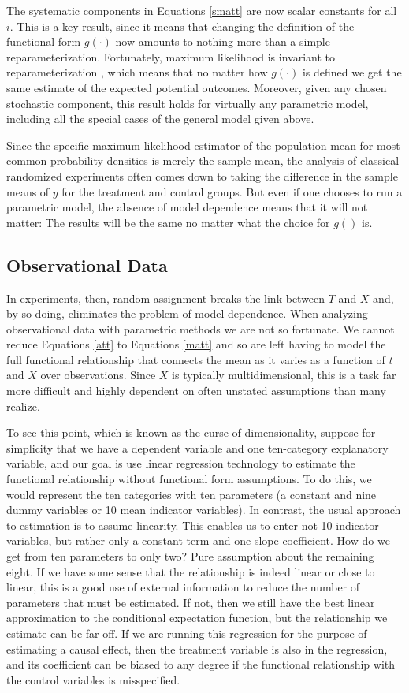 \documentclass[11pt,titlepage]{article}
\begin{document}
The systematic components in Equations \ref{smatt} are now scalar
constants for all $i$.  This is a key result, since it means that
changing the definition of the functional form $g(\cdot)$ now amounts
to nothing more than a simple reparameterization.  Fortunately,
maximum likelihood is invariant to reparameterization
\citep[][p.75-6]{King89}, which means that no matter how $g(\cdot)$ is
defined we get the same estimate of the expected potential outcomes.
Moreover, given any chosen stochastic component, this result holds for
virtually any parametric model, including all the special cases of the
general model given above.

Since the specific maximum likelihood estimator of the population mean
for most common probability densities is merely the sample mean, the
analysis of classical randomized experiments often comes down to
taking the difference in the sample means of $y$ for the treatment and
control groups.  But even if one chooses to run a parametric model,
the absence of model dependence means that it will not matter: The
results will be the same no matter what the choice for $g()$ is.

\subsection{Observational Data} \label{s:paraobs}

In experiments, then, random assignment breaks the link between $T$
and $X$ and, by so doing, eliminates the problem of model dependence.
When analyzing observational data with parametric methods we are not
so fortunate.  We cannot reduce Equations \ref{att} to Equations
\ref{matt} and so are left having to model the full functional
relationship that connects the mean as it varies as a function of $t$
and $X$ over observations.  Since $X$ is typically multidimensional,
this is a task far more difficult and highly dependent on often
unstated assumptions than many realize.

To see this point, which is known as the curse of dimensionality,
suppose for simplicity that we have a dependent variable and one
ten-category explanatory variable, and our goal is use linear
regression technology to estimate the functional relationship without
functional form assumptions.  To do this, we would represent the ten
categories with ten parameters (a constant and nine dummy variables or
10 mean indicator variables).  In contrast, the usual approach to
estimation is to assume linearity.  This enables us to enter not 10
indicator variables, but rather only a constant term and one slope
coefficient.  How do we get from ten parameters to only two?  Pure
assumption about the remaining eight.  If we have some sense that the
relationship is indeed linear or close to linear, this is a good use
of external information to reduce the number of parameters that must
be estimated.  If not, then we still have the best linear
approximation to the conditional expectation function, but the
relationship we estimate can be far off.  If we are running this
regression for the purpose of estimating a causal effect, then the
treatment variable is also in the regression, and its coefficient can
be biased to any degree if the functional relationship with the
control variables is misspecified.
\end{document}
